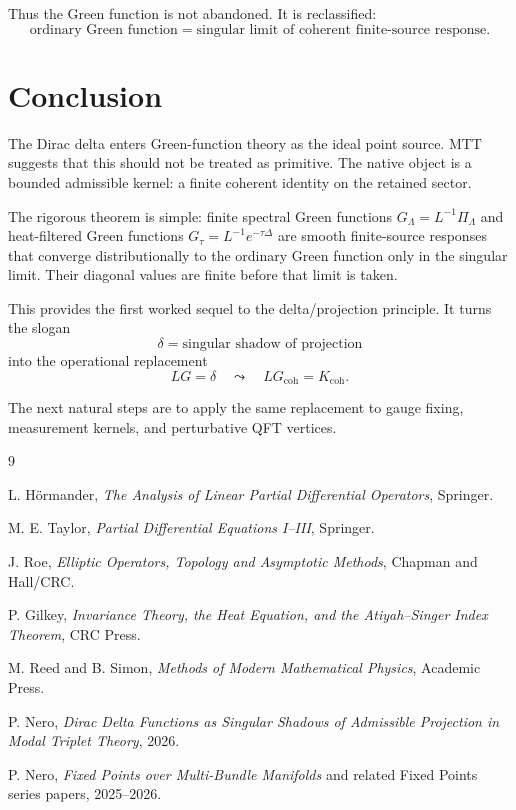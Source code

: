\documentclass[11pt]{article}
\begin{document}
Thus the Green function is not abandoned. It is reclassified:
\[
\boxed{
\text{ordinary Green function}=\text{singular limit of coherent finite-source response}.
}
\]

\section{Conclusion}

The Dirac delta enters Green-function theory as the ideal point source. MTT suggests that this should not be treated as primitive. The native object is a bounded admissible kernel: a finite coherent identity on the retained sector.

The rigorous theorem is simple: finite spectral Green functions \(G_\Lambda=L^{-1}\Pi_\Lambda\) and heat-filtered Green functions \(G_\tau=L^{-1}e^{-\tau\Delta}\) are smooth finite-source responses that converge distributionally to the ordinary Green function only in the singular limit. Their diagonal values are finite before that limit is taken.

This provides the first worked sequel to the delta/projection principle. It turns the slogan
\[
\delta=\text{singular shadow of projection}
\]
into the operational replacement
\[
LG=\delta
\quad\leadsto\quad
LG_{\mathrm{coh}}=K_{\mathrm{coh}}.
\]

The next natural steps are to apply the same replacement to gauge fixing, measurement kernels, and perturbative QFT vertices.

\begin{thebibliography}{9}

L. H{\"o}rmander,
\emph{The Analysis of Linear Partial Differential Operators},
Springer.

M. E. Taylor,
\emph{Partial Differential Equations I--III},
Springer.

J. Roe,
\emph{Elliptic Operators, Topology and Asymptotic Methods},
Chapman and Hall/CRC.

P. Gilkey,
\emph{Invariance Theory, the Heat Equation, and the Atiyah--Singer Index Theorem},
CRC Press.

M. Reed and B. Simon,
\emph{Methods of Modern Mathematical Physics},
Academic Press.

P. Nero,
\emph{Dirac Delta Functions as Singular Shadows of Admissible Projection in Modal Triplet Theory},
2026.

P. Nero,
\emph{Fixed Points over Multi-Bundle Manifolds} and related Fixed Points series papers,
2025--2026.

\end{thebibliography}
\end{document}
